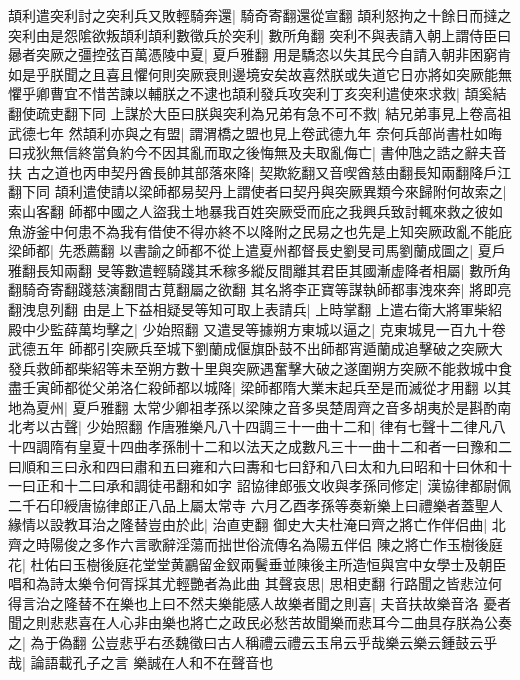頡利遣突利討之突利兵又敗輕騎奔還|{
	騎奇寄翻還從宣翻}
頡利怒拘之十餘日而撻之突利由是怨隂欲叛頡利頡利數徵兵於突利|{
	數所角翻}
突利不與表請入朝上謂侍臣曰曏者突厥之彊控弦百萬憑陵中夏|{
	夏戶雅翻}
用是驕恣以失其民今自請入朝非困窮肯如是乎朕聞之且喜且懼何則突厥衰則邊境安矣故喜然朕或失道它日亦將如突厥能無懼乎卿曹宜不惜苦諫以輔朕之不逮也頡利發兵攻突利丁亥突利遣使來求救|{
	頡奚結翻使疏吏翻下同}
上謀於大臣曰朕與突利為兄弟有急不可不救|{
	結兄弟事見上卷高祖武德七年}
然頡利亦與之有盟|{
	謂渭橋之盟也見上卷武德九年}
奈何兵部尚書杜如晦曰戎狄無信終當負約今不因其亂而取之後悔無及夫取亂侮亡|{
	書仲虺之誥之辭夫音扶}
古之道也丙申契丹酋長帥其部落來降|{
	契欺紇翻又音喫酋慈由翻長知兩翻降戶江翻下同}
頡利遣使請以梁師都易契丹上謂使者曰契丹與突厥異類今來歸附何故索之|{
	索山客翻}
師都中國之人盜我土地暴我百姓突厥受而庇之我興兵致討輒來救之彼如魚游釜中何患不為我有借使不得亦終不以降附之民易之也先是上知突厥政亂不能庇梁師都|{
	先悉薦翻}
以書諭之師都不從上遣夏州都督長史劉旻司馬劉蘭成圖之|{
	夏戶雅翻長知兩翻}
旻等數遣輕騎踐其禾稼多縱反間離其君臣其國漸虚降者相屬|{
	數所角翻騎奇寄翻踐慈演翻間古莧翻屬之欲翻}
其名將李正寶等謀執師都事洩來奔|{
	將即亮翻洩息列翻}
由是上下益相疑旻等知可取上表請兵|{
	上時掌翻}
上遣右衛大將軍柴紹殿中少監薛萬均擊之|{
	少始照翻}
又遣旻等據朔方東城以逼之|{
	克東城見一百九十卷武德五年}
師都引突厥兵至城下劉蘭成偃旗卧鼓不出師都宵遁蘭成追擊破之突厥大發兵救師都柴紹等未至朔方數十里與突厥遇奮擊大破之遂圍朔方突厥不能救城中食盡壬寅師都從父弟洛仁殺師都以城降|{
	梁師都隋大業末起兵至是而滅從才用翻}
以其地為夏州|{
	夏戶雅翻}
太常少卿祖孝孫以梁陳之音多吳楚周齊之音多胡夷於是斟酌南北考以古聲|{
	少始照翻}
作唐雅樂凡八十四調三十一曲十二和|{
	律有七聲十二律凡八十四調隋有皇夏十四曲孝孫制十二和以法天之成數凡三十一曲十二和者一曰豫和二曰順和三曰永和四曰肅和五曰雍和六曰夀和七曰舒和八曰太和九曰昭和十曰休和十一曰正和十二曰承和調徒弔翻和如字}
詔協律郎張文收與孝孫同修定|{
	漢協律都尉佩二千石印綬唐協律郎正八品上屬太常寺}
六月乙酉孝孫等奏新樂上曰禮樂者蓋聖人緣情以設教耳治之隆替豈由於此|{
	治直吏翻}
御史大夫杜淹曰齊之將亡作伴侣曲|{
	北齊之時陽俊之多作六言歌辭淫蕩而拙世俗流傳名為陽五伴侣}
陳之將亡作玉樹後庭花|{
	杜佑曰玉樹後庭花堂堂黄鸝留金釵兩鬢垂並陳後主所造恒與宫中女學士及朝臣唱和為詩太樂令何胥採其尤輕艷者為此曲}
其聲哀思|{
	思相吏翻}
行路聞之皆悲泣何得言治之隆替不在樂也上曰不然夫樂能感人故樂者聞之則喜|{
	夫音扶故樂音洛}
憂者聞之則悲悲喜在人心非由樂也將亡之政民必愁苦故聞樂而悲耳今二曲具存朕為公奏之|{
	為于偽翻}
公豈悲乎右丞魏徵曰古人稱禮云禮云玉帛云乎哉樂云樂云鍾鼓云乎哉|{
	論語載孔子之言}
樂誠在人和不在聲音也


